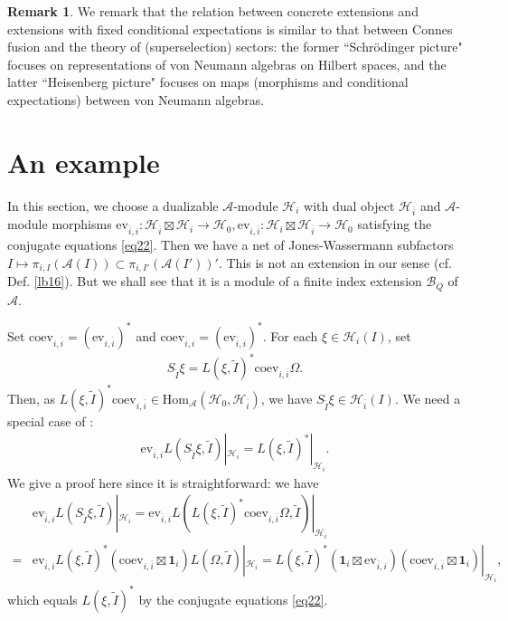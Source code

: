 \documentclass[12pt,a4paper,notitlepage]{article}
\theoremstyle{definition}
\newtheorem{rem}[df]{Remark}
\theoremstyle{plain}
\newcommand{\mc}{\mathcal}
\newcommand{\wtd}{\widetilde}
\newcommand{\ovl}{\overline}
\newcommand{\id}{\mathbf{1}}
\newcommand{\Hom}{\mathrm{Hom}}
\newcommand{\ev}{\mathrm{ev}}
\newcommand{\coev}{\mathrm{coev}}
\numberwithin{equation}{section}
\begin{document}
\begin{rem}
We remark that the relation between  concrete extensions and  extensions with fixed conditional expectations is similar to that between Connes fusion and the theory of (superselection) sectors: the former ``Schr\"odinger picture" focuses  on  representations of von Neumann algebras on Hilbert spaces, and the latter ``Heisenberg picture" focuses on maps (morphisms and conditional expectations) between von Neumann algebras.
\end{rem}



\section{An example}


In this section, we choose a dualizable $\mc A$-module $\mc H_i$ with dual object $\mc H_{\ovl i}$ and $\mc A$-module morphisms $\ev_{\ovl i,i}:\mc H_{\ovl i}\boxtimes\mc H_i\rightarrow\mc H_0,\ev_{i,\ovl i}:\mc H_i\boxtimes\mc H_{\ovl i}\rightarrow\mc H_0$ satisfying the conjugate equations \eqref{eq22}. Then we have a net of Jones-Wassermann subfactors $I\mapsto \pi_{i,I}(\mc A(I))\subset \pi_{i,I'}(\mc A(I'))'$. This is not an extension in our sense (cf. Def. \ref{lb16}). But we shall see that it is a module of a finite index extension $\mc B_Q$ of $\mc A$.

Set $\coev_{i,\ovl i}=(\ev_{i,\ovl i})^*$ and $\coev_{\ovl i,i}=(\ev_{\ovl i,i})^*$. For each $\xi\in\mc H_i(I)$, set
\begin{align*}
S_{\wtd I}\xi=L(\xi,\wtd I)^*\coev_{i,\ovl i}\Omega.
\end{align*}
Then, as $L(\xi,\wtd I)^*\coev_{i,\ovl i}\in\Hom_{\mc A}(\mc H_0,\mc H_{\ovl i})$, we have $S_{\wtd I}\xi\in\mc H_{\ovl i}(I)$. We need a special case of \cite[Cor. 5.6]{Gui21b}:
\begin{align}
\ev_{\ovl i,i}L(S_{\wtd I}\xi,\wtd I)|_{\mc H_i}=L(\xi,\wtd I)^*|_{\mc H_i}.	\label{eq23}
\end{align}
We give a proof here since it is straightforward: we have
\begin{align*}
&\ev_{\ovl i,i}L(S_{\wtd I}\xi,\wtd I)|_{\mc H_i}=\ev_{\ovl i,i}L(L(\xi,\wtd I)^*\coev_{i,\ovl i}\Omega,\wtd I)|_{\mc H_i}\\	
=&\ev_{\ovl i,i}L(\xi,\wtd I)^*(\coev_{i,\ovl i}\boxtimes\id_i)L(\Omega,\wtd I)|_{\mc H_i}=L(\xi,\wtd I)^*(\id_i\boxtimes\ev_{\ovl i,i})(\coev_{i,\ovl i}\boxtimes\id_i)|_{\mc H_i},
\end{align*}
which equals $L(\xi,\wtd I)^*$ by the conjugate equations \eqref{eq22}. 
\end{document}
